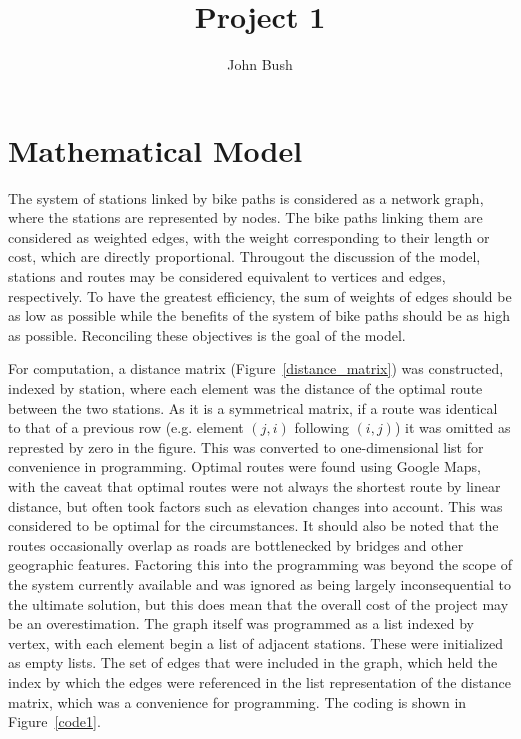 \documentclass{article}
\author{John Bush}
\title{Project 1}
\begin{document}
\section{Mathematical Model} 

The system of stations linked by bike paths is considered as a network graph, where the stations are represented by nodes.  The bike paths linking them are considered as weighted edges, with the weight corresponding to their length or cost, which are directly proportional.  Througout the discussion of the model, stations and routes may be considered equivalent to vertices and edges, respectively.  To have the greatest efficiency, the sum of weights of edges should be as low as possible while the benefits of the system of bike paths should be as high as possible.  Reconciling these objectives is the goal of the model.

For computation, a distance matrix (Figure~\ref{distance_matrix}) was constructed, indexed by station, where each element was the distance of the optimal route between the two stations.  As it is a symmetrical matrix, if a route was identical to that of a previous row (e.g. element $(j, i)$ following $(i, j)$) it was omitted as represted by zero in the figure.  This was converted to one-dimensional list for convenience in programming.  Optimal routes were found using Google Maps, with the caveat that optimal routes were not always the shortest route by linear distance, but often took factors such as elevation changes into account.  This was considered to be optimal for the circumstances.  It should also be noted that the routes occasionally overlap as roads are bottlenecked by bridges and other geographic features.  Factoring this into the programming was beyond the scope of the system currently available and was ignored as being largely inconsequential to the ultimate solution, but this does mean that the overall cost of the project may be an overestimation.  The graph itself was programmed as a list indexed by vertex, with each element begin a list of adjacent stations.  These were initialized as empty lists.  The set of edges that were included in the graph, which held the index by which the edges were referenced in the list representation of the distance matrix, which was a convenience for programming.  The coding is shown in Figure~\ref{code1}.
\end{document}
